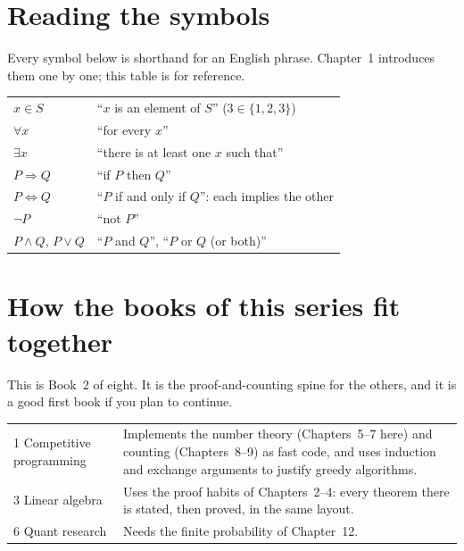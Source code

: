\section*{Reading the symbols}

Every symbol below is shorthand for an English phrase. Chapter~1 introduces them
one by one; this table is for reference.

\begin{center}
\begin{tabular}{lP{9cm}}
\toprule
{} & \\
\midrule
$x\in S$ & ``$x$ is an element of $S$'' ($3\in\{1,2,3\}$)\\
$\forall x$ & ``for every $x$''\\
$\exists x$ & ``there is at least one $x$ such that''\\
$P\Rightarrow Q$ & ``if $P$ then $Q$''\\
$P\Leftrightarrow Q$ & ``$P$ if and only if $Q$'': each implies the other\\
$\neg P$ & ``not $P$''\\
$P\wedge Q$, $P\vee Q$ & ``$P$ and $Q$'', ``$P$ or $Q$ (or both)''\\
\bottomrule
\end{tabular}
\end{center}

\section*{How the books of this series fit together}

This is Book~2 of eight. It is the proof-and-counting spine for the others, and it
is a good first book if you plan to continue.

\begin{center}
\begin{tabular}{P{2.4cm}P{9.0cm}}
\toprule
{} & \\
 Competitive programming & Implements the number theory (Chapters~5--7 here) and counting (Chapters~8--9) as fast code, and uses induction and exchange arguments to justify greedy algorithms.\\
3 Linear algebra & Uses the proof habits of Chapters~2--4: every theorem there is stated, then proved, in the same layout.\\
6 Quant research & Needs the finite probability of Chapter~12.\\
\bottomrule
\end{tabular}
\end{center}

